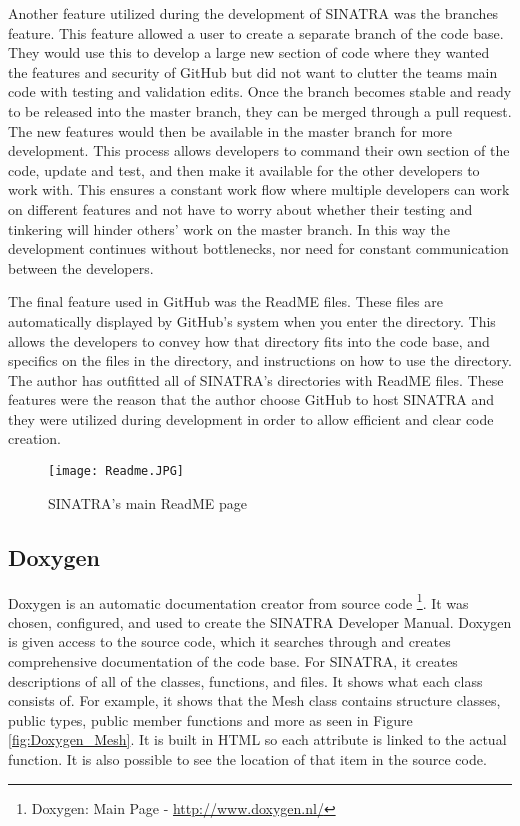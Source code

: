 \indent Another feature utilized during the development of SINATRA was the branches feature. This feature allowed a user to create a separate branch of the code base. They would use this to develop a large new section of code where they wanted the features and security of GitHub but did not want to clutter the teams main code with testing and validation edits. Once the branch becomes stable and ready to be released into the master branch, they can be merged through a pull request. The new features would then be available in the master branch for more development. This process allows developers to command their own section of the code, update and test, and then make it available for the other developers to work with. This ensures a constant work flow where multiple developers can work on different features and not have to worry about whether their testing and tinkering will hinder others’ work on the master branch. In this way the development continues without bottlenecks, nor need for constant communication between the developers. \par
\indent The final feature used in GitHub was the ReadME files. These files are automatically displayed by GitHub’s system when you enter the directory. This allows the developers to convey how that directory fits into the code base, and specifics on the files in the directory, and instructions on how to use the directory. The author has outfitted all of SINATRA’s directories with ReadME files. These features were the reason that the author choose GitHub to host SINATRA and they were utilized during development in order to allow efficient and clear code creation. 

\begin{figure}
\texttt{[image: Readme.JPG]}
\centering
\caption{SINATRA's main ReadME page}
\label{fig:readme}
\end{figure}


\subsection{Doxygen}
Doxygen is an automatic documentation creator from source code \footnote{Doxygen:  Main Page - \url{http://www.doxygen.nl/}}. It was chosen, configured, and used to create the SINATRA Developer Manual. Doxygen is given access to the source code, which it searches through and creates comprehensive documentation of the code base. For SINATRA, it creates descriptions of all of the classes, functions, and files. It shows what each class consists of. For example, it shows that the Mesh class contains structure classes, public types, public member functions and more as seen in Figure \ref{fig:Doxygen_Mesh}. It is built in HTML so each attribute is linked to the actual function. It is also possible to see the location of that item in the source code. \par

